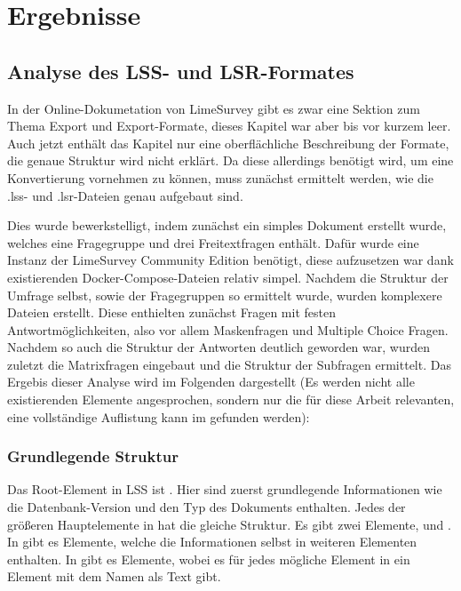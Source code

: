 \chapter{Ergebnisse}
\label{ch:ergebnisse}

\section{Analyse des LSS- und LSR-Formates}

In der Online-Dokumetation von LimeSurvey gibt es zwar eine Sektion zum Thema Export und Export-Formate, dieses Kapitel war aber bis vor kurzem leer.
Auch jetzt enthält das Kapitel nur eine oberflächliche Beschreibung der Formate, die genaue Struktur wird nicht erklärt.
Da diese allerdings benötigt wird, um eine Konvertierung vornehmen zu können, muss zunächst ermittelt werden, wie die .lss- und .lsr-Dateien genau aufgebaut sind.

Dies wurde bewerkstelligt, indem zunächst ein simples Dokument erstellt wurde, welches eine Fragegruppe und drei Freitextfragen enthält.
Dafür wurde eine Instanz der LimeSurvey Community Edition benötigt, diese aufzusetzen war dank existierenden Docker-Compose-Dateien relativ simpel.
Nachdem die Struktur der Umfrage selbst, sowie der Fragegruppen so ermittelt wurde, wurden komplexere Dateien erstellt.
Diese enthielten zunächst Fragen mit festen Antwortmöglichkeiten, also vor allem Maskenfragen und Multiple Choice Fragen.
Nachdem so auch die Struktur der Antworten deutlich geworden war, wurden zuletzt die Matrixfragen eingebaut und die Struktur der Subfragen ermittelt.
Das Ergebis dieser Analyse wird im Folgenden dargestellt (Es werden nicht alle existierenden Elemente angesprochen, sondern nur die für diese Arbeit relevanten, eine vollständige Auflistung kann im %
gefunden werden):

\subsection{Grundlegende Struktur}

Das Root-Element in LSS ist .
Hier sind zuerst grundlegende Informationen wie die Datenbank-Version und den Typ des Dokuments enthalten.
Jedes der größeren Hauptelemente in  hat die gleiche Struktur.
Es gibt zwei Elemente,  und . In  gibt es  Elemente, welche die Informationen selbst in weiteren Elementen enthalten.
In  gibt es  Elemente, wobei es für jedes mögliche Element in  ein  Element mit dem Namen als Text gibt.

